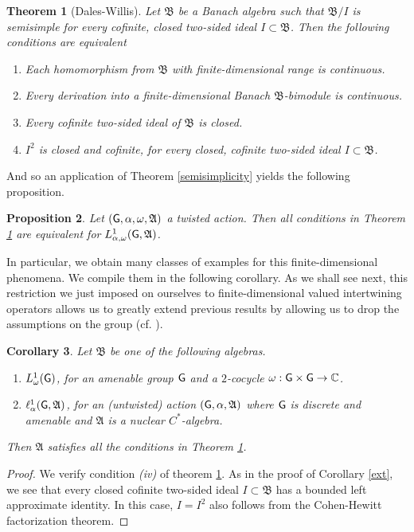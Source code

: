 \documentclass[11pt]{article}
\newcommand{\A}{\mathfrak{A}}
\newcommand{\B}{\mathfrak{B}}
\newcommand{\CC}{\mathbb{C}}
\def\G{{\sf G}}
\newtheorem{thm}{Theorem}[section]
\newtheorem{cor}[thm]{Corollary}
\newtheorem{prop}[thm]{Proposition}
\theoremstyle{definition}
\theoremstyle{remark}
\numberwithin{equation}{section}
\numberwithin{equation}{section}
\begin{document}
\begin{thm}[Dales-Willis]\label{DAWI}
    Let $\B$ be a Banach algebra such that $\B/I$ is semisimple for every cofinite, closed two-sided ideal $I\subset \B$. Then the following conditions are equivalent\begin{enumerate}
        \item[(i)] Each homomorphism from $\B$ with finite-dimensional range is continuous.
        \item[(ii)] Every derivation into a finite-dimensional Banach $\B$-bimodule is continuous.
        \item[(iii)] Every cofinite two-sided ideal of $\B$ is closed.
        \item[(iv)] $I^2$ is closed and cofinite, for every closed, cofinite two-sided ideal $I\subset \B$.
    \end{enumerate}
\end{thm}


And so an application of Theorem \ref{semisimplicity} yields the following proposition.
\begin{prop}
    Let $(\G,\alpha,\omega,\A)$ a twisted action. Then all conditions in Theorem \ref{DAWI} are equivalent for $L^1_{\alpha,\omega}(\G,\A)$.
\end{prop}

In particular, we obtain many classes of examples for this finite-dimensional phenomena. We compile them in the following corollary. As we shall see next, this restriction we just imposed on ourselves to finite-dimensional valued intertwining operators allows us to greatly extend previous results by allowing us to drop the assumptions on the group (cf. \cite[Corollary 4.21]{flores2024}).
\begin{cor}
    Let $\B$ be one of the following algebras. \begin{enumerate}
        \item[(i)] $L^1_\omega(\G)$, for an amenable group $\G$ and a $2$-cocycle $\omega:\G\times \G\to \CC$.
        \item[(ii)] $\ell^1_\alpha(\G,\A)$, for an (untwisted) action $(\G,\alpha, \A)$ where $\G$ is discrete and amenable and $\A$ is a nuclear $C^*$-algebra.
    \end{enumerate} Then $\A$ satisfies all the conditions in Theorem \ref{DAWI}.
\end{cor}
\begin{proof}
   We verify condition \emph{(iv)} of theorem \ref{DAWI}. As in the proof of Corollary \ref{ext}, we see that every closed cofinite two-sided ideal $I\subset\B$ has a bounded left approximate identity. In this case, $I=I^2$ also follows from the Cohen-Hewitt factorization theorem.
\end{proof}
\end{document}
